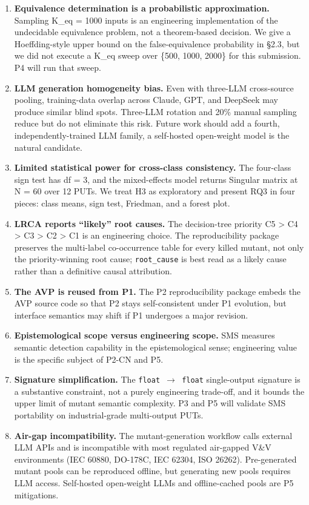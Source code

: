 \documentclass[review,12pt,authoryear]{elsarticle}
\begin{document}
\begin{enumerate}
\def\labelenumi{(\arabic{enumi})}
\item
  \textbf{Equivalence determination is a probabilistic approximation.}
  Sampling K\_eq = 1000 inputs is an engineering implementation of the
  undecidable equivalence problem, not a theorem-based decision. We give
  a Hoeffding-style upper bound on the false-equivalence probability in
  §2.3, but we did not execute a K\_eq sweep over \{500, 1000, 2000\}
  for this submission. P4 will run that sweep.
\item
  \textbf{LLM generation homogeneity bias.} Even with three-LLM
  cross-source pooling, training-data overlap across Claude, GPT, and
  DeepSeek may produce similar blind spots. Three-LLM rotation and 20\%
  manual sampling reduce but do not eliminate this risk. Future work
  should add a fourth, independently-trained LLM family, a self-hosted
  open-weight model is the natural candidate.
\item
  \textbf{Limited statistical power for cross-class consistency.} The
  four-class sign test has df = 3, and the mixed-effects model returns
  Singular matrix at N = 60 over 12 PUTs. We treat H3 as exploratory and
  present RQ3 in four pieces: class means, sign test, Friedman, and a
  forest plot.
\item
  \textbf{LRCA reports ``likely'' root causes.} The decision-tree
  priority C5 \textgreater{} C4 \textgreater{} C3 \textgreater{} C2
  \textgreater{} C1 is an engineering choice. The reproducibility
  package preserves the multi-label co-occurrence table for every killed
  mutant, not only the priority-winning root cause; \texttt{root\_cause}
  is best read as a likely cause rather than a definitive causal
  attribution.
\item
  \textbf{The AVP is reused from P1.} The P2 reproducibility package
  embeds the AVP source code so that P2 stays self-consistent under P1
  evolution, but interface semantics may shift if P1 undergoes a major
  revision.
\item
  \textbf{Epistemological scope versus engineering scope.} SMS measures
  semantic detection capability in the epistemological sense;
  engineering value is the specific subject of P2-CN and P5.
\item
  \textbf{Signature simplification.} The \texttt{float\ $\to$\ float}
  single-output signature is a substantive constraint, not a purely
  engineering trade-off, and it bounds the upper limit of mutant
  semantic complexity. P3 and P5 will validate SMS portability on
  industrial-grade multi-output PUTs.
\item
  \textbf{Air-gap incompatibility.} The mutant-generation workflow calls
  external LLM APIs and is incompatible with most regulated air-gapped
  V\&V environments (IEC 60880, DO-178C, IEC 62304, ISO 26262).
  Pre-generated mutant pools can be reproduced offline, but generating
  new pools requires LLM access. Self-hosted open-weight LLMs and
  offline-cached pools are P5 mitigations.
\end{enumerate}
\end{document}
